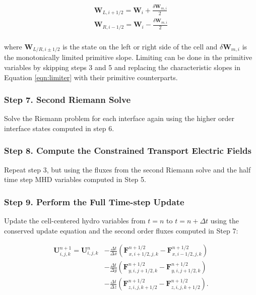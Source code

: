 \documentclass[modern, linenumbers]{aastex631}
\begin{document}
    \begin{equation}
        \begin{aligned}
            \boldsymbol{W}_{L, i+1/2} = \boldsymbol{W}_{i} + \frac{\delta \boldsymbol{W}_{m, i}}{2} \\
            \boldsymbol{W}_{R, i-1/2} = \boldsymbol{W}_{i} - \frac{\delta \boldsymbol{W}_{m, i}}{2} \\
        \end{aligned}
    \end{equation}

    \noindent where $ \boldsymbol{W}_{L/R, i\pm1/2} $ is the state on the left or right side
    of the cell and $ \delta \boldsymbol{W}_{m, i} $ is the monotonically limited
    primitive slope. Limiting can be done in the primitive variables by skipping steps 3 and 5 and replacing the characteristic slopes in Equation \ref{eqn:limiter} with their primitive counterparts.

\subsubsection{Step 7. Second Riemann Solve}
\label{vlct:2nd-riemann-solve}

Solve the Riemann problem for each interface again using the higher order interface states computed in step 6.

\subsubsection{Step 8. Compute the Constrained Transport Electric Fields}
\label{vlct:2nd-emf}

Repeat step 3, but using the fluxes from the second Riemann solve and the half time step MHD variables computed in Step 5.

\subsubsection{Step 9. Perform the Full Time-step Update}
\label{vlct:full-dt-update}

Update the cell-centered hydro variables from $t = n$ to $t = n + \Delta t$ using the conserved update equation and the second order fluxes computed in Step 7:

\begin{equation}
    \begin{aligned}
        \boldsymbol{U}^{n+1}_{i,j,k} = \boldsymbol{U}^{n}_{i,j,k}
        &- \frac{\Delta t}{\Delta x} \left( \boldsymbol{F}^{n+1/2}_{x,i+1/2,j,k} - \boldsymbol{F}^{n+1/2}_{x,i-1/2,j,k} \right) \\
        &- \frac{\Delta t}{\Delta y} \left( \boldsymbol{F}^{n+1/2}_{y,i,j+1/2,k} - \boldsymbol{F}^{n+1/2}_{y,i,j+1/2,k} \right) \\
        &- \frac{\Delta t}{\Delta z} \left( \boldsymbol{F}^{n+1/2}_{z,i,j,k+1/2} - \boldsymbol{F}^{n+1/2}_{z,i,j,k+1/2} \right).
    \end{aligned}
\end{equation}
\end{document}
